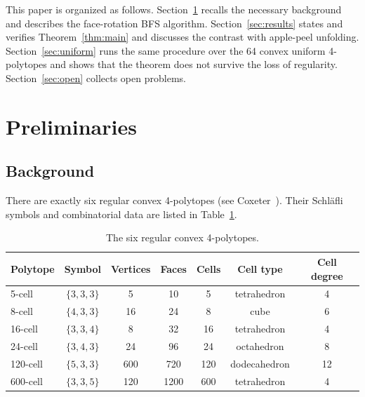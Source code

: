 \documentclass[11pt,letterpaper]{article}
\begin{document}
This paper is organized as follows.
Section~\ref{sec:theory} recalls the necessary background and describes
the face-rotation BFS algorithm.
Section~\ref{sec:results} states and verifies Theorem~\ref{thm:main}
and discusses the contrast with apple-peel unfolding.
Section~\ref{sec:uniform} runs the same procedure over the 64 convex
uniform 4-polytopes and shows that the theorem does not survive the
loss of regularity.
Section~\ref{sec:open} collects open problems.

\section{Preliminaries}\label{sec:theory}

\subsection{Background}\label{sec:background}


There are exactly six regular convex 4-polytopes (see
Coxeter~\cite{Coxeter1973}).
Their Schl\"{a}fli symbols and combinatorial data are listed in
Table~\ref{tab:polytopes}.

\begin{table}[ht]
\centering
\caption{The six regular convex 4-polytopes.}
\label{tab:polytopes}
\begin{tabular}{lcccccc}
\toprule
Polytope & Symbol & Vertices & Faces & Cells & Cell type & Cell degree\\
\midrule
5-cell    & $\{3,3,3\}$ &   5 &   10 &    5 & tetrahedron    & 4 \\
8-cell    & $\{4,3,3\}$ &  16 &   24 &    8 & cube           & 6 \\
16-cell   & $\{3,3,4\}$ &   8 &   32 &   16 & tetrahedron    & 4 \\
24-cell   & $\{3,4,3\}$ &  24 &   96 &   24 & octahedron     & 8 \\
120-cell  & $\{5,3,3\}$ & 600 &  720 &  120 & dodecahedron   & 12\\
600-cell  & $\{3,3,5\}$ & 120 & 1200 &  600 & tetrahedron    & 4 \\
\bottomrule
\end{tabular}
\end{table}
\end{document}
